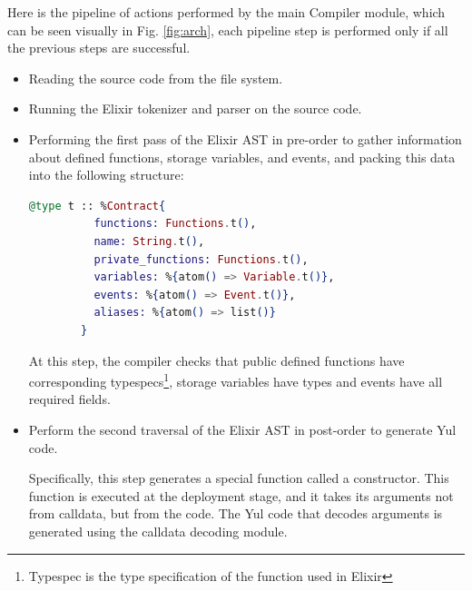 Here is the pipeline of actions performed by the main Compiler module, which can be seen visually in Fig. \ref{fig:arch}, each pipeline step is performed only if all the previous steps are successful.

\begin{itemize}
    \item Reading the source code from the file system.
    \item Running the Elixir tokenizer and parser on the source code.
    \item Performing the first pass of the Elixir AST in pre-order to gather information about defined functions, storage variables, and events, and packing this data into the following structure:
    
    \begin{lstlisting}[caption={Contract structure}, language=elixir, label={lst:contract_structure}]
      @type t :: %Contract{
          functions: Functions.t(),
          name: String.t(),
          private_functions: Functions.t(),
          variables: %{atom() => Variable.t()},
          events: %{atom() => Event.t()},
          aliases: %{atom() => list()}
        }
    \end{lstlisting}
    
    At this step, the compiler checks that public defined functions have corresponding typespecs\footnote{Typespec is the type specification of the function used in Elixir}, storage variables have types and events have all required fields.

    \item Perform the second traversal of the Elixir AST in post-order to generate Yul code.
    
    Specifically, this step generates a special function called a constructor. This function is executed at the deployment stage, and it takes its arguments not from calldata, but from the code. The Yul code that decodes arguments is generated using the calldata decoding module.


\end{itemize}

